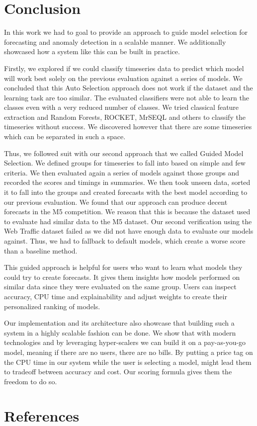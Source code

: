 \documentclass[smallabstract,smallcaptions]{dccpaper}
\begin{document}
\newpage
\section{Conclusion}
In this work we had to goal to provide an approach to guide model selection for forecasting and anomaly detection in a scalable manner. We additionally showcased how a system like this can be built in practice.

Firstly, we explored if we could classify timeseries data to predict which model will work best solely on the previous evaluation against a series of models. We concluded that this Auto Selection approach does not work if the dataset and the learning task are too similar. The evaluated classifiers were not able to learn the classes even with a very reduced number of classes. We tried classical feature extraction and Random Forests, ROCKET, MrSEQL and others to classify the timeseries without success. We discovered however that there are some timeseries which can be separated in such a space.

Thus, we followed suit with our second approach that we called Guided Model Selection. We defined groups for timeseries to fall into based on simple and few criteria. We then evaluated again a series of models against those groups and recorded the scores and timings in summaries. We then took unseen data, sorted it to fall into the groups and created forecasts with the best model according to our previous evaluation. We found that our approach can produce decent forecasts in the M5 competition. We reason that this is because the dataset used to evaluate had similar data to the M5 dataset. Our second verification using the Web Traffic dataset failed as we did not have enough data to evaluate our models against. Thus, we had to fallback to default models, which create a worse score than a baseline method. 

This guided approach is helpful for users who want to learn what models they could try to create forecasts. It gives them insights how models performed on similar data since they were evaluated on the same group. Users can inspect accuracy, CPU time and explainability and adjust weights to create their personalized ranking of models.

Our implementation and its architecture also showcase that building such a system in a highly scalable fashion can be done. We show that with modern technologies and by leveraging hyper-scalers we can build it on a pay-as-you-go model, meaning if there are no users, there are no bills. By putting a price tag on the CPU time in our system while the user is selecting a model, might lead them to tradeoff between accuracy and cost. Our scoring formula gives them the freedom to do so.



\newpage
\section{References}


\end{document}
